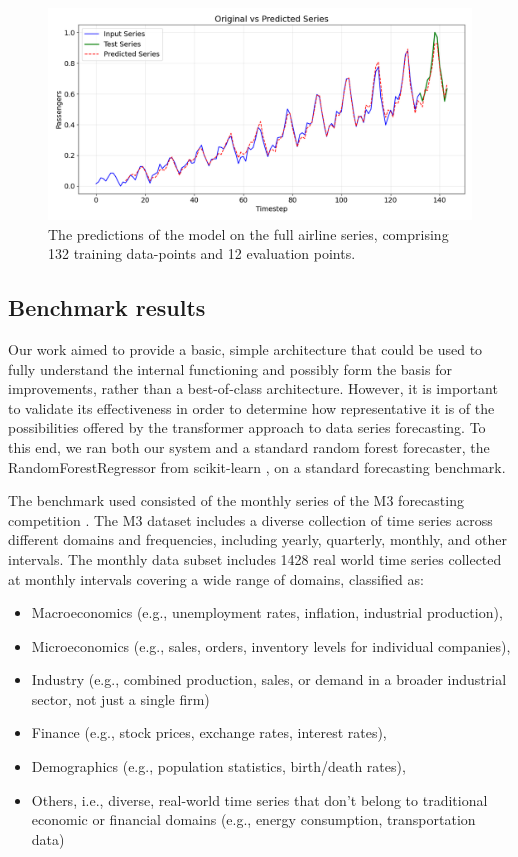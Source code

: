 \documentclass[algorithms,article,submit,pdftex,moreauthors]{Definitions/mdpi}
\begin{document}
\begin{figure}
	\centering
	\includegraphics[width=0.90\linewidth]{airlines.png}
	\caption{The predictions of the model on the full airline series, comprising 132 training data-points and 12 evaluation points.}
	\label{fig:airlines}
\end{figure}

\subsection{Benchmark results} \label{subsec:benchmark}

Our work aimed to provide a basic, simple architecture that could be used to fully understand the internal functioning and possibly form the basis for improvements, rather than a best-of-class architecture. However, it is important to validate its effectiveness in order to determine how representative it is of the possibilities offered by the transformer approach to data series forecasting. To this end, we ran both our system and a standard random forest forecaster, the RandomForestRegressor from scikit-learn \cite{GEW06}, on a standard forecasting benchmark.

The benchmark used consisted of the monthly series of the M3 forecasting competition \cite{MH00}. The M3 dataset includes a diverse collection of time series across different domains and frequencies, including yearly, quarterly, monthly, and other intervals. The monthly data subset includes 1428 real world time series collected at monthly intervals covering a wide range of domains, classified as:
\begin{itemize}
	\item Macroeconomics (e.g., unemployment rates, inflation, industrial production),
	\item Microeconomics (e.g., sales, orders, inventory levels for individual companies),
	\item Industry (e.g., combined production, sales, or demand in a broader industrial sector, not just a single firm)
	\item Finance (e.g., stock prices, exchange rates, interest rates),
	\item Demographics (e.g., population statistics, birth/death rates),
	\item Others, i.e., diverse, real-world time series that don’t belong to traditional economic or financial domains (e.g., energy consumption, transportation data)
\end{itemize}
\end{document}
